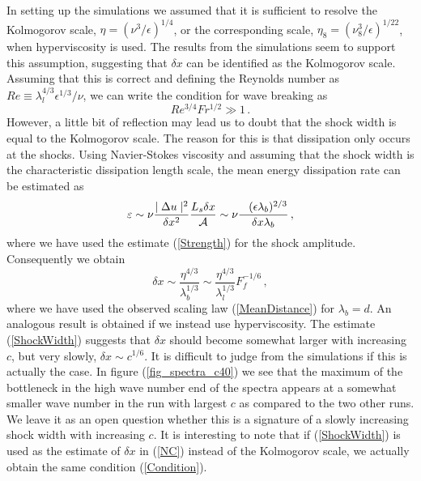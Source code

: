 \documentclass{jfm}
\newcommand{\eps}{\varepsilon}
\begin{document}
In setting up the simulations we assumed that it is sufficient to resolve the Kolmogorov scale, $ \eta = (\nu^{3} / \epsilon)^{1/4} $, or the corresponding scale, $ \eta_8 = (\nu_8^{3}/\epsilon) ^{1/22} $, when hyperviscosity is used. The results from the simulations seem to support this assumption, suggesting that $ \delta x $ can be identified as the Kolmogorov scale.  Assuming that this is correct and defining the Reynolds number as $ Re \equiv \lambda_l^{4/3}\epsilon ^{1/3} /\nu $, we can write the condition for wave breaking as
\begin{equation} \label{Condition} 
Re^{3/4} Fr^{1/2} \gg 1 \, .
\end{equation} 
However, a little bit of reflection may lead us to doubt that the shock width is equal to the Kolmogorov scale. The reason for this is that dissipation only occurs at the shocks.
Using Navier-Stokes viscosity and assuming that the shock width is the characteristic dissipation length scale, the mean energy dissipation rate can be estimated as
\begin{equation}
\eps \sim \nu \frac{\mid \Delta u \mid ^2}{\delta x ^2} \frac{L_s \delta x}{\cal{A}} \sim \nu \frac{ \;\;\;  (\epsilon \lambda_b)^{2/3} }{\delta x \lambda_b} \, ,
\end{equation} 
where we have used the estimate (\ref{Strength}) for the shock amplitude. Consequently we obtain
\begin{equation} \label{ShockWidth}
\delta x \sim \frac{\eta^{4/3}}{\lambda_b^{1/3}} \sim \frac{\eta^{4/3}}{\lambda_l^{1/3}} F_f^{-1/6} \, ,
\end{equation} 
where we have used the observed scaling law (\ref{MeanDistance}) for $ \lambda_b = d $. An analogous result is obtained if we instead use hyperviscosity.  The estimate (\ref{ShockWidth}) suggests that $ \delta x $ should become somewhat larger  with increasing $ c $, but very slowly, $ \delta x \sim c^{1/6} $.  It is difficult to judge from the simulations  if this is actually the case. In figure (\ref{fig_spectra_c40}) we see that the maximum of the bottleneck in the high wave number end of the spectra appears at a somewhat smaller wave number in the run with largest $ c $ as compared to the two other runs. We leave it as an open question whether this is a signature of a slowly increasing shock width with increasing $ c $. It is interesting to note that if (\ref{ShockWidth}) is used as the estimate of $ \delta x $ in (\ref{NC}) instead of the Kolmogorov scale, we actually obtain the same condition (\ref{Condition}).
\end{document}
